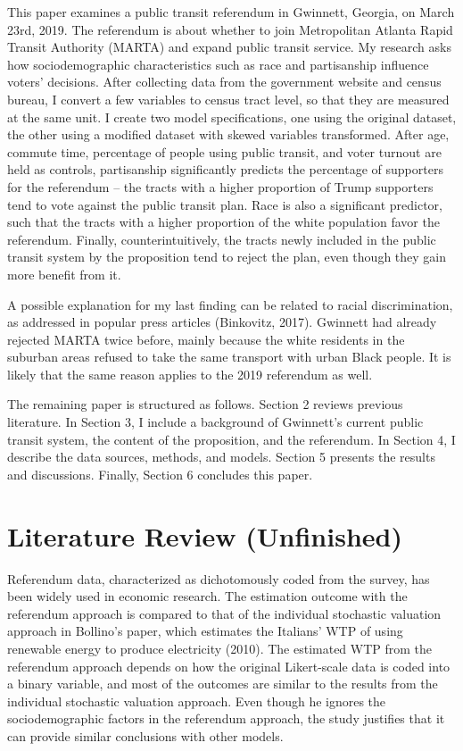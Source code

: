 \documentclass[
]{article}
\begin{document}
This paper examines a public transit referendum in Gwinnett, Georgia, on
March 23rd, 2019. The referendum is about whether to join Metropolitan
Atlanta Rapid Transit Authority (MARTA) and expand public transit
service. My research asks how sociodemographic characteristics such as
race and partisanship influence voters' decisions. After collecting data
from the government website and census bureau, I convert a few variables
to census tract level, so that they are measured at the same unit. I
create two model specifications, one using the original dataset, the
other using a modified dataset with skewed variables transformed. After
age, commute time, percentage of people using public transit, and voter
turnout are held as controls, partisanship significantly predicts the
percentage of supporters for the referendum -- the tracts with a higher
proportion of Trump supporters tend to vote against the public transit
plan. Race is also a significant predictor, such that the tracts with a
higher proportion of the white population favor the referendum. Finally,
counterintuitively, the tracts newly included in the public transit
system by the proposition tend to reject the plan, even though they gain
more benefit from it.

A possible explanation for my last finding can be related to racial
discrimination, as addressed in popular press articles (Binkovitz,
2017). Gwinnett had already rejected MARTA twice before, mainly because
the white residents in the suburban areas refused to take the same
transport with urban Black people. It is likely that the same reason
applies to the 2019 referendum as well.

The remaining paper is structured as follows. Section 2 reviews previous
literature. In Section 3, I include a background of Gwinnett's current
public transit system, the content of the proposition, and the
referendum. In Section 4, I describe the data sources, methods, and
models. Section 5 presents the results and discussions. Finally, Section
6 concludes this paper.

\hypertarget{literature-review-unfinished}{%
\section{Literature Review
(Unfinished)}\label{literature-review-unfinished}}

Referendum data, characterized as dichotomously coded from the survey,
has been widely used in economic research. The estimation outcome with
the referendum approach is compared to that of the individual stochastic
valuation approach in Bollino's paper, which estimates the Italians' WTP
of using renewable energy to produce electricity (2010). The estimated
WTP from the referendum approach depends on how the original
Likert-scale data is coded into a binary variable, and most of the
outcomes are similar to the results from the individual stochastic
valuation approach. Even though he ignores the sociodemographic factors
in the referendum approach, the study justifies that it can provide
similar conclusions with other models.
\end{document}
